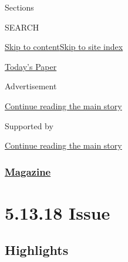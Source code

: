 Sections

SEARCH

\protect\hyperlink{site-content}{Skip to
content}\protect\hyperlink{site-index}{Skip to site index}

\href{https://myaccount.nytimes3xbfgragh.onion/auth/login?response_type=cookie\&client_id=vi}{}

\href{https://www.nytimes3xbfgragh.onion/section/todayspaper}{Today's
Paper}

Advertisement

\protect\hyperlink{after-top}{Continue reading the main story}

Supported by

\protect\hyperlink{after-sponsor}{Continue reading the main story}

\hypertarget{magazine}{%
\subsubsection{\texorpdfstring{\href{/section/magazine}{Magazine}}{Magazine}}\label{magazine}}

\hypertarget{51318-issue}{%
\section{5.13.18 Issue}\label{51318-issue}}

\hypertarget{highlights}{%
\subsection{Highlights}\label{highlights}}

